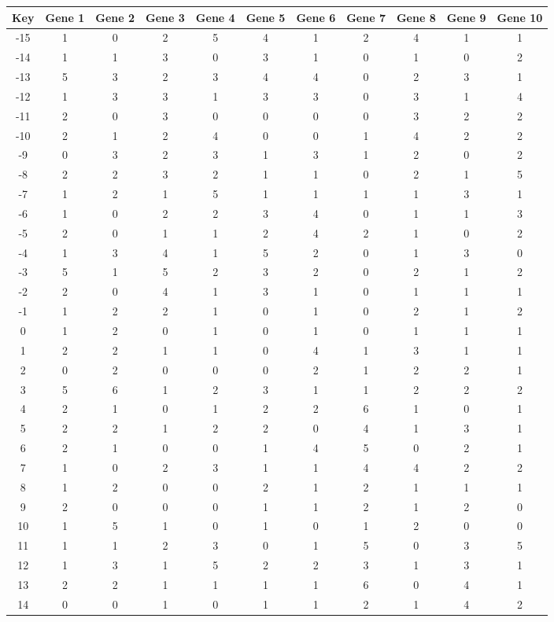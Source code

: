 \begin{tabular}{|c|c|c|c|c|c|c|c|c|c|c|}
\hline
Key & Gene 1 & Gene 2 & Gene 3 & Gene 4 & Gene 5 & Gene 6 & Gene 7 & Gene 8 & Gene 9 & Gene 10 \\
\hline
-15 & 1 & 0 & 2 & 5 & 4 & 1 & 2 & 4 & 1 & 1 \\
-14 & 1 & 1 & 3 & 0 & 3 & 1 & 0 & 1 & 0 & 2 \\
-13 & 5 & 3 & 2 & 3 & 4 & 4 & 0 & 2 & 3 & 1 \\
-12 & 1 & 3 & 3 & 1 & 3 & 3 & 0 & 3 & 1 & 4 \\
-11 & 2 & 0 & 3 & 0 & 0 & 0 & 0 & 3 & 2 & 2 \\
-10 & 2 & 1 & 2 & 4 & 0 & 0 & 1 & 4 & 2 & 2 \\
-9 & 0 & 3 & 2 & 3 & 1 & 3 & 1 & 2 & 0 & 2 \\
-8 & 2 & 2 & 3 & 2 & 1 & 1 & 0 & 2 & 1 & 5 \\
-7 & 1 & 2 & 1 & 5 & 1 & 1 & 1 & 1 & 3 & 1 \\
-6 & 1 & 0 & 2 & 2 & 3 & 4 & 0 & 1 & 1 & 3 \\
-5 & 2 & 0 & 1 & 1 & 2 & 4 & 2 & 1 & 0 & 2 \\
-4 & 1 & 3 & 4 & 1 & 5 & 2 & 0 & 1 & 3 & 0 \\
-3 & 5 & 1 & 5 & 2 & 3 & 2 & 0 & 2 & 1 & 2 \\
-2 & 2 & 0 & 4 & 1 & 3 & 1 & 0 & 1 & 1 & 1 \\
-1 & 1 & 2 & 2 & 1 & 0 & 1 & 0 & 2 & 1 & 2 \\
0 & 1 & 2 & 0 & 1 & 0 & 1 & 0 & 1 & 1 & 1 \\
1 & 2 & 2 & 1 & 1 & 0 & 4 & 1 & 3 & 1 & 1 \\
2 & 0 & 2 & 0 & 0 & 0 & 2 & 1 & 2 & 2 & 1 \\
3 & 5 & 6 & 1 & 2 & 3 & 1 & 1 & 2 & 2 & 2 \\
4 & 2 & 1 & 0 & 1 & 2 & 2 & 6 & 1 & 0 & 1 \\
5 & 2 & 2 & 1 & 2 & 2 & 0 & 4 & 1 & 3 & 1 \\
6 & 2 & 1 & 0 & 0 & 1 & 4 & 5 & 0 & 2 & 1 \\
7 & 1 & 0 & 2 & 3 & 1 & 1 & 4 & 4 & 2 & 2 \\
8 & 1 & 2 & 0 & 0 & 2 & 1 & 2 & 1 & 1 & 1 \\
9 & 2 & 0 & 0 & 0 & 1 & 1 & 2 & 1 & 2 & 0 \\
10 & 1 & 5 & 1 & 0 & 1 & 0 & 1 & 2 & 0 & 0 \\
11 & 1 & 1 & 2 & 3 & 0 & 1 & 5 & 0 & 3 & 5 \\
12 & 1 & 3 & 1 & 5 & 2 & 2 & 3 & 1 & 3 & 1 \\
13 & 2 & 2 & 1 & 1 & 1 & 1 & 6 & 0 & 4 & 1 \\
14 & 0 & 0 & 1 & 0 & 1 & 1 & 2 & 1 & 4 & 2 \\
\hline
\end{tabular}